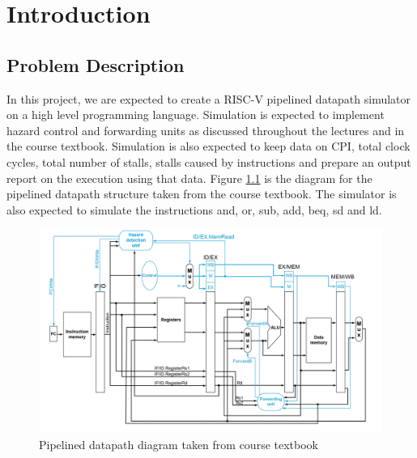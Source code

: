 \chapter{Introduction}
\section{Problem Description}
In this project, we are expected to create a RISC-V pipelined datapath simulator on a high level programming language. Simulation is expected to implement hazard control and forwarding units as discussed throughout the lectures and in the course textbook. Simulation is also expected to keep data on CPI, total clock cycles, total number of stalls, stalls caused by instructions and prepare an output report on the execution using that data. Figure \ref{fig:datapath} is the diagram for the pipelined datapath structure taken from the course textbook. The simulator is also expected to simulate the instructions and, or, sub, add, beq, sd and ld. \\

\href{https://drive.google.com/drive/folders/104gLuhNgoEN1hMbGKwAH2UXVvRCwPsN0}{\color{blue}{GOOGLE DRIVE LINK FOR THE CODE}}
\begin{figure}
    \centering
    \includegraphics[scale=0.5]{1.png}
    \caption{Pipelined datapath diagram taken from course textbook}
    \label{fig:datapath}
\end{figure}

